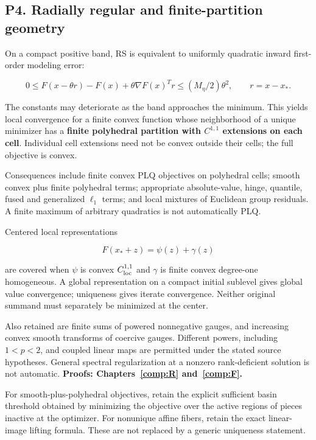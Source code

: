 \subsection{P4. Radially regular and finite-partition geometry}\label{p4.-radially-regular-and-finite-partition-geometry}

On a compact positive band, RS is equivalent to uniformly quadratic inward first-order modeling error:

\[
 0\le F(x-\theta r)-F(x)+\theta\nabla F(x)^Tr
 \le(M_\eta/2)\theta^2,\qquad r=x-x_*.
\]

The constants may deteriorate as the band approaches the minimum. This yields local convergence for a finite convex function whose neighborhood of a unique minimizer has a \textbf{finite polyhedral partition with \(C^{1,1}\) extensions on each cell}. Individual cell extensions need not be convex outside their cells; the full objective is convex.

Consequences include finite convex PLQ objectives on polyhedral cells; smooth convex plus finite polyhedral terms; appropriate absolute-value, hinge, quantile, fused and generalized \(\ell_1\) terms; and local mixtures of Euclidean group residuals. A finite maximum of arbitrary quadratics is not automatically PLQ.

Centered local representations

\[F(x_*+z)=\psi(z)+\gamma(z)\]

are covered when \(\psi\) is convex \(C^{1,1}_{\rm loc}\) and \(\gamma\) is finite convex degree-one homogeneous. A global representation on a compact initial sublevel gives global value convergence; uniqueness gives iterate convergence. Neither original summand must separately be minimized at the center.

Also retained are finite sums of powered nonnegative gauges, and increasing convex smooth transforms of coercive gauges. Different powers, including \(1<p<2\), and coupled linear maps are permitted under the stated source hypotheses. General spectral regularization at a nonzero rank-deficient solution is not automatic. \textbf{Proofs: Chapters~\ref{comp:R} and~\ref{comp:F}.}

For smooth-plus-polyhedral objectives, retain the explicit sufficient basin threshold obtained by minimizing the objective over the active regions of pieces inactive at the optimizer. For nonunique affine fibers, retain the exact linear-image lifting formula. These are not replaced by a generic uniqueness statement.

